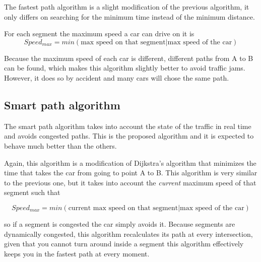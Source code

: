 The fastest path algorithm is a slight modification of the previous algorithm, it only differs on searching for the minimum time instead of the minimum distance.

For each segment the maximum speed a car can drive on it is \[Speed_{max} = min(\text{max speed on that segment} | \text{max speed of the car})\]

Because the maximum speed of each car is different, different paths from A to B can be found, which makes this algorithm slightly better to avoid traffic jams. However, it does so by accident and many cars will chose the same path.

\subsection{Smart path algorithm}

The smart path algorithm takes into account the state of the traffic in real time and avoids congested paths. This is the proposed algorithm and it is expected to behave much better than the others.

Again, this algorithm is a modification of Dijkstra's algorithm that minimizes the time that takes the car from going to point A to B. This algorithm is very similar to the previous one, but it takes into account the \emph{current} maximum speed of that segment such that

\[Speed_{max} = min(\text{current max speed on that segment} | \text{max speed of the car})\]

so if a segment is congested the car simply avoids it. Because segments are dynamically congested, this algorithm recalculates its path at every intersection, given that you cannot turn around inside a segment this algorithm effectively keeps you in the fastest path at every moment.






